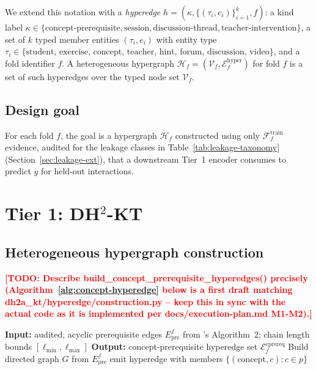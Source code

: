 \documentclass[journal]{IEEEtran}
\newcommand{\todo}[1]{\textcolor{red}{\textbf{[TODO: #1]}}}
\begin{document}
We extend this notation with a \emph{hyperedge} $h = (\kappa,
\{(\tau_i, e_i)\}_{i=1}^{k}, f)$: a kind label $\kappa \in
\{\text{concept-prerequisite}, \text{session}, \text{discussion-thread},
\text{teacher-intervention}\}$, a set of $k$ typed member entities
$(\tau_i, e_i)$ with entity type $\tau_i \in \{\text{student, exercise,
concept, teacher, hint, forum, discussion, video}\}$, and a fold identifier
$f$. A heterogeneous hypergraph $\mathcal{H}_f = (\mathcal{V}_f,
\mathcal{E}_f^{\mathrm{hyper}})$ for fold $f$ is a set of such hyperedges
over the typed node set $\mathcal{V}_f$.

\subsection{Design goal}
For each fold $f$, the goal is a hypergraph $\mathcal{H}_f$ constructed
using only $\mathcal{F}_f^{\mathrm{train}}$ evidence, audited for the
leakage classes in Table~\ref{tab:leakage-taxonomy}
(Section~\ref{sec:leakage-ext}), that a downstream Tier~1 encoder consumes
to predict $y$ for held-out interactions.

\section{Tier 1: DH$^2$-KT}

\subsection{Heterogeneous hypergraph construction}
\label{sec:tier1-graph}

\todo{Describe build\_concept\_prerequisite\_hyperedges() precisely
(Algorithm~\ref*{alg:concept-hyperedge} below is a first draft matching
dh2a\_kt/hyperedge/construction.py -- keep this in sync with the actual code
as it is implemented per docs/execution-plan.md M1-M2).}

\begin{algorithmic}[1]
\STATE \textbf{Input:} audited, acyclic prerequisite edges
$E_{\mathrm{pre}}^f$ from \cite{daominh2026p0}'s Algorithm~2; chain length
bounds $[\ell_{\min}, \ell_{\max}]$
\STATE \textbf{Output:} concept-prerequisite hyperedge set
$\mathcal{E}^{\mathrm{cprereq}}_f$
\STATE Build directed graph $G$ from $E_{\mathrm{pre}}^f$
    \STATE emit hyperedge with members $\{(\text{concept}, c) : c \in p\}$
  \ENDFOR
\ENDFOR
\end{algorithmic}
\label{alg:concept-hyperedge}
\end{document}
